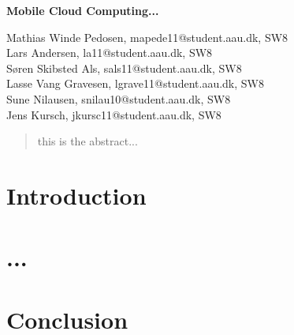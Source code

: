 \documentclass[12pt,a4paper]{article}
\begin{document}
\begin{center}
\bigskip\bigskip
{\Large\bf Mobile Cloud Computing...}
\bigskip\bigskip


Mathias Winde Pedosen, mapede11@student.aau.dk, SW8\\
Lars Andersen, la11@student.aau.dk, SW8\\
Søren Skibsted Als, sals11@student.aau.dk, SW8\\
Lasse Vang Gravesen, lgrave11@student.aau.dk, SW8\\
Sune Nilausen, snilau10@student.aau.dk, SW8\\
Jens Kursch, jkursc11@student.aau.dk, SW8

\bigskip
\begin{abstract}
this is the abstract...
\end{abstract}

\thispagestyle{empty}
\end{center}


\titlepage



\thispagestyle{plain}


\section{Introduction}

\section{...}



\section{Conclusion}




\end{document}
